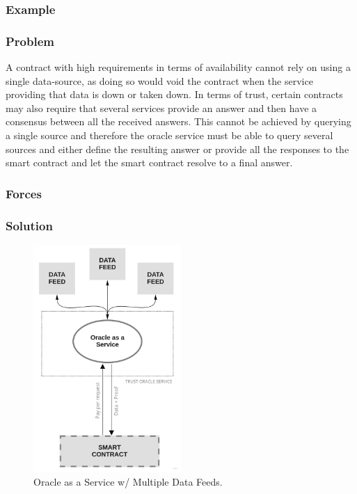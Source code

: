 \subsubsection{Example} 

\subsubsection{Problem}
A contract with high requirements in terms of availability cannot rely on using a single data-source, as doing so would void the contract when the service providing that data is down or taken down. In terms of trust, certain contracts may also require that several services provide an answer and then have a consensus between all the received answers. This cannot be achieved by querying a single source and therefore the oracle service must be able to query several sources and either define the resulting answer or provide all the responses to the smart contract and let the smart contract resolve to a final answer.

\subsubsection{Forces}

\subsubsection{Solution}
\begin{figure}[t]
  \begin{center}
    \leavevmode
    \includegraphics[width=0.5\textwidth]{figures/oraclearch2.jpg}
    \caption{Oracle as a Service w/ Multiple Data Feeds.}
    \label{fig:/figures/paper-screening}
  \end{center}
\end{figure}

